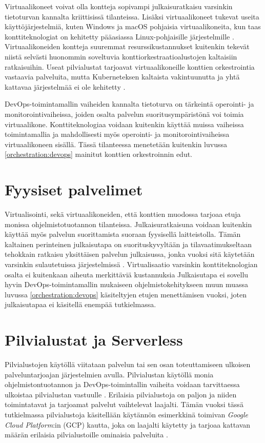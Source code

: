 Virtuaalikoneet voivat olla kontteja sopivampi julkaisuratkaisu varsinkin tietoturvan kannalta kriittisissä tilanteissa.
Lisäksi virtuaalikoneet tukevat useita käyttöjärjestelmiä, kuten Windows ja macOS pohjaisia virtuaalikoneita, kun taas konttiteknologiat on kehitetty pääasiassa Linux-pohjaisille järjestelmille \cite{}.
Virtuaalikoneiden kontteja suuremmat resurssikustannukset kuitenkin tekevät niistä selvästi huonommin soveltuvia konttiorkestraatioalustojen kaltaisiin ratkaisuihin.
Useat pilvialustat tarjoavat virtuaalikoneille konttien orkestrointia vastaavia palveluita, mutta Kuberneteksen kaltaista vakintuunutta ja yhtä kattavaa järjestelmää ei ole kehitetty \cite{}.

DevOps-toimintamallin vaiheiden kannalta tietoturva on tärkeintä operointi- ja monitorointivaiheissa, joiden osalta palvelun suoritusympäristönä voi toimia virtuaalikone.
Konttiteknologiaa voidaan kuitenkin käyttää muissa vaiheissa toimintamallia ja mahdollisesti myös operointi- ja monitorointivaiheissa virtuaalikoneen sisällä.
Tässä tilanteessa menetetään kuitenkin luvussa \ref{orchestration:devops} mainitut konttien orkestroinnin edut.

\section{Fyysiset palvelimet}

Virtualisointi, sekä virtuaalikoneiden, että konttien muodossa tarjoaa etuja monissa ohjelmistotuotannon tilanteissa.
Julkaisuratkaisuna voidaan kuitenkin käyttää myös palvelun suorittamista suoraan fyysisellä laitteistolla.
Tämän kaltainen perinteinen julkaisutapa on suorituskyvyltään ja tilavaatimukseltaan tehokkain ratkaisu yksittäisen palvelun julkaisussa, jonka vuoksi sitä käytetään varsinkin sulautetuissa järjestelmissä \cite{Heiser08}.
Virtualisaatio varsinkin konttiteknologian osalta ei kuitenkaan aiheuta merkittäviä kustannuksia \cite{torrez19}
Julkaisutapa ei sovellu hyvin DevOps-toimintamallin mukaiseen ohjelmistokehitykseen muun muassa luvussa \ref{orchestration:devops} käsiteltyjen etujen menettämisen vuoksi, joten julkaisutapaa ei käsitellä enempää tutkielmassa.

\section{Pilvialustat ja Serverless}

Pilvialustojen käytöllä viitataan palvelun tai sen osan toteuttamiseen ulkoisen palveluntarjoajan järjestelmien avulla.
Pilvialustan käytöllä monia ohjelmistontuotannon ja DevOps-toimintallin vaiheita voidaan tarvittaessa ulkoistaa pilvialustan vastuulle \cite{tomarchio20}.
Erilaisia pilvialustoja on paljon ja niiden toimintatavat ja tarjoamat palvelut vaihtelevat laajalti.
Tämän vuoksi tässä tutkielmassa pilvialustoja käsitellään käytännön esimerkkinä toimivan \textit{Google Cloud Platform}:in (GCP) kautta, joka on laajalti käytetty ja tarjoaa kattavan määrän erilaisia pilvialustoille ominaisia palveluita \cite{ahuja20}.


